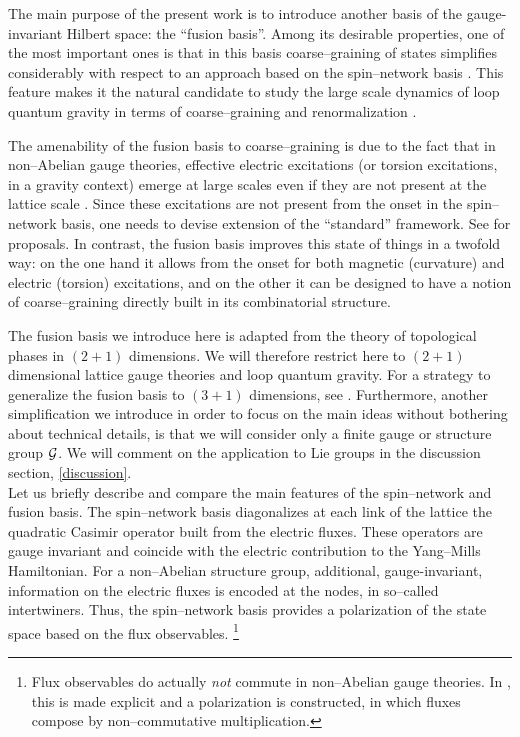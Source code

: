 \documentclass[nofootinbib,superscriptaddress,eqsecnum,tightenlines,11pt]{revtex4-1}
\begin{document}
The main purpose of the present work is to introduce another basis of the gauge-invariant Hilbert space: the ``fusion basis''.
Among its desirable properties, one of the most important ones is that in this basis coarse--graining of states simplifies considerably with respect to an approach based on the spin--network basis \cite{EteraCG,Clement}. 
 This feature makes it the natural candidate to study  the large scale dynamics of loop quantum gravity in terms of coarse--graining and renormalization \cite{BD14}.

The amenability of the fusion basis to coarse--graining is due to the fact that in non--Abelian gauge theories, effective electric excitations (or torsion excitations, in a gravity context) emerge at large scales even if they are not present at the lattice scale \cite{DG14b}. 
Since these excitations are not present from the onset in the spin--network basis, one needs to devise extension of the ``standard'' framework. See \cite{EteraTags} for proposals.   
In contrast, the fusion basis improves this state of things in a twofold way: on the one hand it allows from the onset for both magnetic (curvature) and electric (torsion) excitations, and on the other it can be designed to have a notion of coarse--graining directly built in its combinatorial structure.

The fusion basis we introduce here is adapted from the theory of topological phases in $(2+1)$ dimensions.
We will therefore restrict here to $(2+1)$ dimensional lattice gauge theories and loop quantum gravity. 
For a strategy to generalize the fusion basis to $(3+1)$ dimensions, see \cite{DelDitt}. 
Furthermore, another simplification we introduce in order to focus on the main ideas without bothering about technical details, is that we will consider only a finite gauge or structure group ${\cal G}$.
We will comment on the application to Lie groups in the discussion section, \ref{discussion}.\\


Let us briefly describe and compare the main features of the spin--network and fusion basis.  The spin--network  basis diagonalizes at each link of the lattice the quadratic Casimir operator built from the electric fluxes. 
These operators are gauge invariant and coincide with the electric contribution to the Yang--Mills Hamiltonian. 
For a non--Abelian structure group, 
additional, gauge-invariant, information on the electric fluxes is encoded at the nodes, in so--called intertwiners.
Thus,
 the spin--network basis provides a polarization of the state space based on the flux observables.%
\footnote{ Flux observables do actually \textit{not} commute in non--Abelian gauge theories. In \cite{BaratinEtAl}, this is made explicit and a polarization is constructed, in which fluxes compose by non--commutative multiplication.}  
\end{document}
